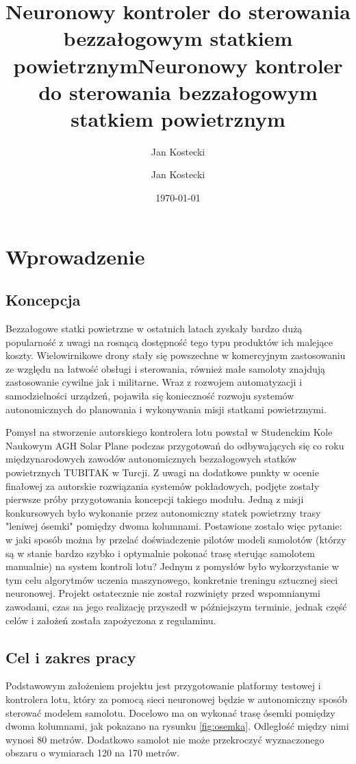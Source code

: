 \documentclass[12pt, a4paper]{article}
\title{Neuronowy kontroler do sterowania bezzałogowym statkiem powietrznym}
\author{Jan Kostecki}
\title{Neuronowy kontroler do sterowania bezzałogowym statkiem powietrznym}
\author{Jan Kostecki}
\date{\today}
\begin{document}
\onehalfspacing


\newpage
\tableofcontents

\clearpage

\section{Wprowadzenie}
\subsection{Koncepcja}

Bezzałogowe statki powietrzne w ostatnich latach zyskały bardzo dużą popularność z uwagi na rosnącą dostępność tego typu produktów ich malejące koszty. Wielowirnikowe drony stały się powszechne w komercyjnym zastosowaniu ze względu na łatwość obsługi i sterowania, również małe samoloty znajdują zastosowanie cywilne jak i militarne. Wraz z rozwojem automatyzacji i samodzielności urządzeń, pojawiła się konieczność rozwoju systemów autonomicznych do planowania i wykonywania misji statkami powietrznymi.

Pomysł na stworzenie autorskiego kontrolera lotu powstał w Studenckim Kole Naukowym AGH Solar Plane podczas przygotowań do odbywających się co roku międzynarodowych zawodów autonomicznych bezzałogowych statków powietrznych TUBITAK w Turcji. Z uwagi na dodatkowe punkty w ocenie finałowej za autorskie rozwiązania systemów pokładowych, podjęte zostały pierwsze próby przygotowania koncepcji takiego modułu. Jedną z misji konkursowych było wykonanie przez autonomiczny statek powietrzny trasy "leniwej ósemki" pomiędzy dwoma kolumnami. Postawione zostało więc pytanie: w jaki sposób można by przelać doświadczenie pilotów modeli samolotów (którzy są w stanie bardzo szybko i optymalnie pokonać trasę sterując samolotem manualnie) na system kontroli lotu? Jednym z pomysłów było wykorzystanie w tym celu algorytmów uczenia maszynowego, konkretnie treningu sztucznej sieci neuronowej. Projekt ostatecznie nie został rozwinięty przed wspomnianymi zawodami, czas na jego realizację przyszedł w późniejszym terminie, jednak część celów i założeń została zapożyczona z regulaminu.

\subsection{Cel i zakres pracy}
Podstawowym założeniem projektu jest przygotowanie platformy testowej i kontrolera lotu, który za pomocą sieci neuronowej będzie w autonomiczny sposób sterować modelem samolotu. Docelowo ma on wykonać trasę ósemki pomiędzy dwoma kolumnami, jak pokazano na rysunku \ref{fig:osemka}. Odległość między nimi wynosi 80 metrów. Dodatkowo samolot nie może przekroczyć wyznaczonego obszaru o wymiarach 120 na 170 metrów.
\end{document}
